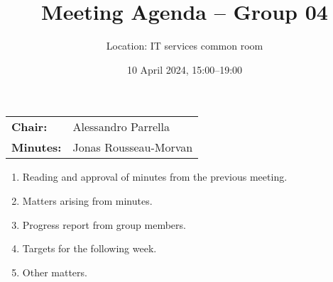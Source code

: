 \documentclass{cce2014-meetings}
\title{Meeting Agenda -- Group 04}
\author{Location: IT services common room}
\date{10 April 2024, 15:00--19:00}
\begin{document}
\maketitle
\begin{center}
        \begin{tabular}{ll}
                \textbf{Chair:}   & Alessandro Parrella \\
                \textbf{Minutes:} & Jonas Rousseau-Morvan
        \end{tabular}
\end{center}

\begin{enumerate}

        \item Reading and approval of minutes from the previous meeting.

        \item Matters arising from minutes.

        \item Progress report from group members.

        \item Targets for the following week.

        \item Other matters.

\end{enumerate}
\end{document}

